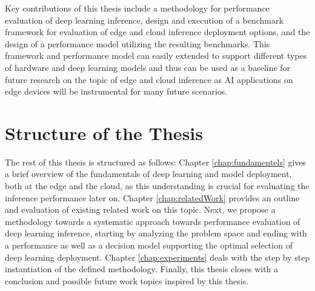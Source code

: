 Key contributions of this thesis include a methodology for performance evaluation of deep learning inference, design and execution of a benchmark framework for evaluation of edge and cloud inference deployment options, and the design of a performance model utilizing the resulting benchmarks.
This framework and performance model can easily extended to support different types of hardware and deep learning models and thus can be used as a baseline for future research on the topic of edge and cloud inference as AI applications on edge devices will be instrumental for many future scenarios.



\section{Structure of the Thesis}
The rest of this thesis is structured as follows: 
Chapter \ref{chap:fundamentels} gives a brief overview of the fundamentals of deep learning and model deployment, both at the edge and the cloud, as this understanding is crucial for evaluating the inference performance later on.
Chapter \ref{chap:relatedWork} provides an outline and evaluation of existing related work on this topic. 
Next, we propose a methodology towards a systematic approach towards performance evaluation of deep learning inference, starting by analyzing the problem space and ending with a performance as well as a decision model supporting the optimal selection of deep learning deployment.
Chapter \ref{chap:experiments} deals with the step by step instantiation of the defined methodology.
Finally, this thesis closes with a conclusion and possible future work topics inspired by this thesis.
